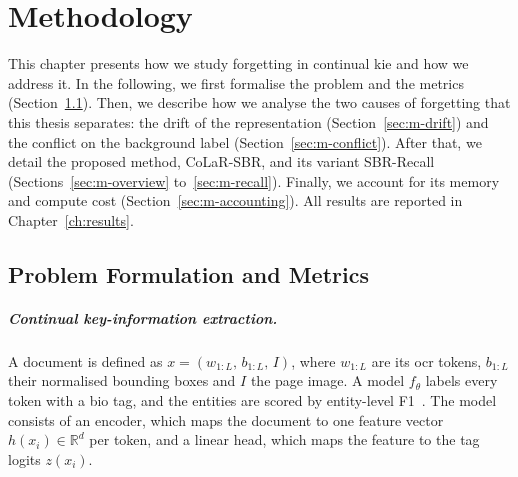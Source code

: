 \chapter{Methodology}
\label{ch:methodology}

This chapter presents how we study forgetting in continual \gls{kie} and how we address it.
In the following, we first formalise the problem and the metrics
(Section~\ref{sec:m-formulation}). Then, we describe how we analyse the two causes of
forgetting that this thesis separates: the drift of the representation
(Section~\ref{sec:m-drift}) and the conflict on the background label
(Section~\ref{sec:m-conflict}). After that, we detail the proposed method, CoLaR-SBR, and its
variant SBR-Recall (Sections~\ref{sec:m-overview} to~\ref{sec:m-recall}). Finally, we account
for its memory and compute cost (Section~\ref{sec:m-accounting}). All results are reported in
Chapter~\ref{ch:results}.

\section{Problem Formulation and Metrics}
\label{sec:m-formulation}

\paragraph{Continual key-information extraction.} A document is defined as
$x=(w_{1:L},\,b_{1:L},\,I)$, where $w_{1:L}$ are its \gls{ocr} tokens, $b_{1:L}$ their
normalised bounding boxes and $I$ the page image. A model $f_\theta$ labels every token with
a \gls{bio} tag, and the entities are scored by entity-level F1~\citep{tjong2003conll}. The
model consists of an encoder, which maps the document to one feature vector $h(x_i)\in
\mathbb{R}^{d}$ per token, and a linear head, which maps the feature to the tag logits
$z(x_i)$.

